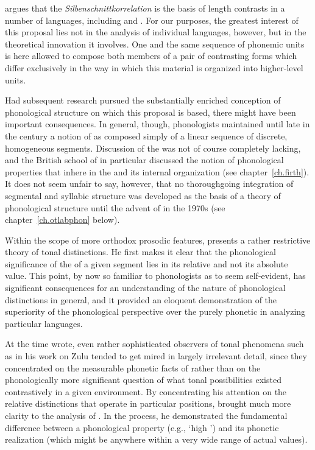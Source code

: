 {\Trubetzkoy} argues that the \emph{Silbenschnittkorrelation} is the
basis of length contrasts in a number of languages, including 
and . For our purposes, the greatest interest of this proposal
lies not in the analysis of individual languages, however, but in the
theoretical innovation it involves. One and the same sequence of
phonemic units is here allowed to compose both members of a pair of
contrasting forms which differ exclusively in the way in which this
material is organized into higher-level units.

Had subsequent research pursued the substantially enriched conception
of phonological structure on which this proposal is based, there might
have been important consequences. In general, though, phonologists
maintained until late in the century a notion of  as
composed simply of a linear sequence of discrete, homogeneous
segments. Discussion of the  was not of course completely
lacking, and the British school of  in particular
discussed the notion of phonological properties that inhere in the
 and its internal organization (see
chapter~\ref{ch.firth}). It does not seem unfair to say, however, that
no thoroughgoing integration of segmental and syllabic structure was
developed as the basis of a theory of phonological structure until the
advent of  in the 1970s (see
chapter~\ref{ch.otlabphon} below).

Within the scope of more orthodox prosodic features, {\Trubetzkoy}
presents a rather restrictive theory of tonal distinctions. He first
makes it clear that the phonological significance of the  of a
given segment lies in its relative and not its absolute value. This
point, by now so familiar to phonologists as to seem self-evident, has
significant consequences for an understanding of the nature of
phonological distinctions in general, and it provided an eloquent
demonstration of the superiority of the phonological perspective over
the purely phonetic in analyzing particular languages.

At the time {\Trubetzkoy} wrote, even rather sophisticated observers of
tonal phenomena such as \citet{doke26:zulu} in his work on Zulu
tended to get mired in largely irrelevant detail, since they
concentrated on the measurable phonetic facts of  rather than on
the phonologically more significant question of what tonal
possibilities existed contrastively in a given environment. By
concentrating his attention on the relative  distinctions that
operate in particular positions, {\Trubetzkoy} brought much more clarity
to the analysis of . In the process, he demonstrated the
fundamental difference between a phonological property (e.g., `high
') and its phonetic realization (which might be anywhere within a
very wide range of actual  values).


